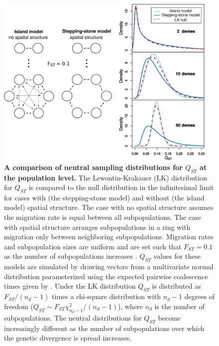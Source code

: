 \begin{figure}
  \centering
  \includegraphics[width=0.95\textwidth]{./figures/pop_struct_combine_alt.pdf}
  \caption{ \textbf{A comparison of neutral sampling distributions for $Q_{ST}$
      at the population level.} The Lewontin-Krakauer (LK) distribution for
    $Q_{ST}$ is compared to the null distribution in the infinitesimal limit for
    cases with (the stepping-stone model) and without (the island model) spatial
    structure. The case with no spatial structure assumes the migration rate is
    equal between all subpopulations. The case with spatial structure arranges
    subpopulations in a ring with migration only between neighboring
    subpopulations. Migration rates and subpopulation sizes are uniform and are
    set such that $F_{ST}=0.1$ as the number of subpopulations increases
    \citep{Slatkin1991}. $Q_{ST}$ values for these models are simulated by
    drawing vectors from a multivariate normal distribution parameterized using
    the expected pairwise coalescence times given by \citep{Slatkin1991}. Under
    the LK distribution $Q_{ST}$ is distributed as $F_{ST}/(n_d - 1)$ times a
    chi-square distribution with $n_d - 1$ degrees of freedom ($Q_{ST}\sim
    F_{ST}\chi^2_{n_d - 1}/(n_d-1)$), where $n_d$ is the number of
    subpopulations. The neutral distributions for
    $Q_{ST}$ become increasingly different as the number of subpopulations over
    which the genetic divergence is spread increases.}
  \label{fig:qst_deme}
\end{figure}
